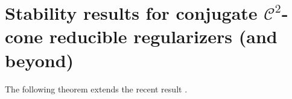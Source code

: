 \documentclass[reqno]{amsart}
\numberwithin{equation}{section}
\newcommand{\X}{\mathbb{X}}
\newcommand{\x}{\bar{x}}
\newcommand{\para}{\mathrm{par}\,}
\begin{document}


\section{Stability results for conjugate $\mathcal{C}^2$-cone reducible regularizers (and beyond)}\label{sec:Stability}

The following theorem extends the recent result \cite[Theorem~4]{CHNS 26}.
\end{document}
